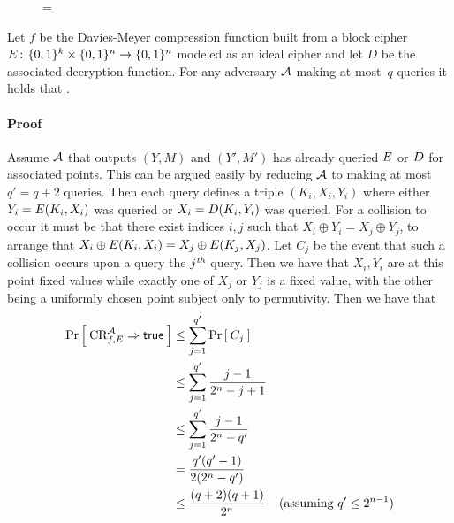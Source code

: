 \begin{figure}

\bnm
{} = 
\enm

\end{figure}

\begin{theorem*}
Let $f$ be the Davies-Meyer compression function built from a block cipher
$E{{\kern .05em}\colon{\kern .05em}}\{0,1\}^k\times\{0,1\}^n\rightarrow\{0,1\}^n$ modeled as an ideal
cipher and let $D$ be the associated decryption function.
For any adversary ${\mathcal A}$ making at most~$q$ queries it holds that
\bnm
   \le {} \;.
\enm
\end{theorem*}

\paragraph{Proof}
Assume ${\mathcal A}$ that outputs $(Y,M)$ and $(Y',M')$ has already queried $E$ or $D$ for associated points.
This can be argued easily by reducing ${\mathcal A}$ to making at most $q' = q+2$ queries.
Then each query defines a triple $(K_i,X_i,Y_i)$ where either $Y_i = E(K_i,X_i)$ was queried or $X_i =
D(K_i,Y_i)$ was queried. For a collision to occur it must be that there
exist indices $i,j$ such that $X_i \oplus Y_i = X_j \oplus Y_j$, to arrange that
$X_i \oplus E(K_i,X_i) = X_j \oplus E(K_j,X_j)$. Let $C_j$ be the
event that such a collision occurs upon a query the $j^{\textit{th}}$ query. Then we have
that $X_i,Y_i$ are at this point fixed values while exactly one of $X_j$ or
$Y_j$ is a fixed value, with the other being a uniformly chosen point subject
only to permutivity. Then we have that 
\begin{align*}
\Pr\left[\: \textnormal{CR}_{f,E}^{\mathcal A}\Rightarrow\mathsf{true} \:\right] 
    &\le \sum_{j=1}^{q'} \Pr\left[\: C_j \:\right]  &  \\
    &\le \sum_{j=1}^{q'} \frac{j-1}{2^n-j+1} &\\
    &\le \sum_{j=1}^{q'} \frac{j-1}{2^n-q'} &\\
    &= \frac{q'(q'-1)}{2(2^n-q')} & \\
    &\le \frac{(q+2)(q+1)}{2^n} &( \text{assuming }q' \leq 2^{n-1} ) \\
\end{align*}

